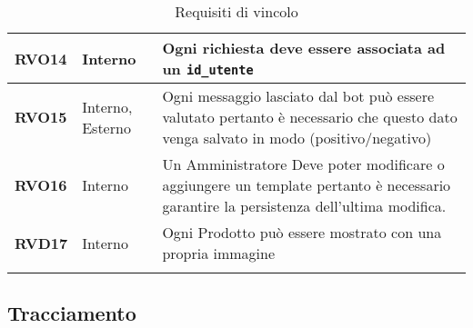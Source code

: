 \begin{longtable}{|>{\centering\arraybackslash}m{}|>{\centering\arraybackslash}m{}|>{\centering\arraybackslash}m{}|}
	\hline
	\textbf{RVO14} & Interno &  Ogni richiesta deve essere associata ad un \texttt{id\_utente}\\
	\hline
	\textbf{RVO15} & Interno, Esterno & Ogni messaggio lasciato dal bot può essere valutato pertanto è necessario che questo dato venga salvato in modo (positivo/negativo)\\
	\hline 
	\textbf{RVO16} & Interno & Un Amministratore Deve poter modificare o aggiungere un template pertanto è necessario garantire la persistenza dell'ultima modifica.\\
	\hline
	\textbf{RVD17} & Interno & Ogni Prodotto può essere mostrato con una propria immagine\\
	\hline
	\caption{Requisiti di vincolo}
\end{longtable}

\pagebreak
\subsection{Tracciamento}
